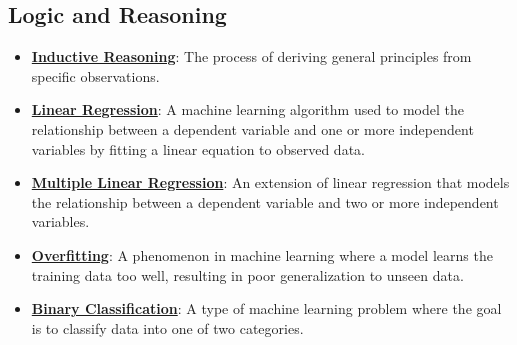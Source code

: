 \documentclass{article}%
\begin{document}
\subsection{Logic and Reasoning}%
\label{subsec:LogicandReasoning}%
\begin{itemize}[leftmargin=*]%
\item \href{https://purdue.brightspace.com/d2l/common/assets/pdfjs-d2l-dist/1.0.14-legacy/web/viewer.html?file=\%2Fcontent\%2Fenforced\%2F1095467-wl.202510.CS.24300.001\%2F05L2-ML Basics.pdf\%3Fou\%3D1095467\&lang=en-us\&container=d2l-fileviewer-rendered-pdf\&fullscreen=d2l-fileviewer-rendered-pdf-dialog\&height=667#page=3}{\textbf{Inductive Reasoning}}: The process of deriving general principles from specific observations.%
\item \href{https://purdue.brightspace.com/d2l/common/assets/pdfjs-d2l-dist/1.0.14-legacy/web/viewer.html?file=\%2Fcontent\%2Fenforced\%2F1095467-wl.202510.CS.24300.001\%2F05L2-ML Basics.pdf\%3Fou\%3D1095467\&lang=en-us\&container=d2l-fileviewer-rendered-pdf\&fullscreen=d2l-fileviewer-rendered-pdf-dialog\&height=667#page=6}{\textbf{Linear Regression}}: A machine learning algorithm used to model the relationship between a dependent variable and one or more independent variables by fitting a linear equation to observed data.%
\item \href{https://purdue.brightspace.com/d2l/common/assets/pdfjs-d2l-dist/1.0.14-legacy/web/viewer.html?file=\%2Fcontent\%2Fenforced\%2F1095467-wl.202510.CS.24300.001\%2F05L2-ML Basics.pdf\%3Fou\%3D1095467\&lang=en-us\&container=d2l-fileviewer-rendered-pdf\&fullscreen=d2l-fileviewer-rendered-pdf-dialog\&height=667#page=11}{\textbf{Multiple Linear Regression}}: An extension of linear regression that models the relationship between a dependent variable and two or more independent variables.%
\item \href{https://purdue.brightspace.com/d2l/common/assets/pdfjs-d2l-dist/1.0.14-legacy/web/viewer.html?file=\%2Fcontent\%2Fenforced\%2F1095467-wl.202510.CS.24300.001\%2F05L2-ML Basics.pdf\%3Fou\%3D1095467\&lang=en-us\&container=d2l-fileviewer-rendered-pdf\&fullscreen=d2l-fileviewer-rendered-pdf-dialog\&height=667#page=14}{\textbf{Overfitting}}: A phenomenon in machine learning where a model learns the training data too well, resulting in poor generalization to unseen data.%
\item \href{https://purdue.brightspace.com/d2l/common/assets/pdfjs-d2l-dist/1.0.14-legacy/web/viewer.html?file=\%2Fcontent\%2Fenforced\%2F1095467-wl.202510.CS.24300.001\%2F05L2-ML Basics.pdf\%3Fou\%3D1095467\&lang=en-us\&container=d2l-fileviewer-rendered-pdf\&fullscreen=d2l-fileviewer-rendered-pdf-dialog\&height=667#page=20}{\textbf{Binary Classification}}: A type of machine learning problem where the goal is to classify data into one of two categories.%

\end{itemize}
\end{document}
